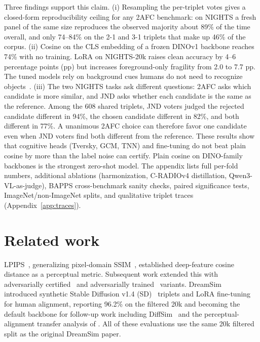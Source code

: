 \documentclass{article}
\begin{document}
Three findings support this claim.  (i) Resampling the per-triplet votes gives a closed-form reproducibility ceiling for any 2AFC benchmark: on NIGHTS a fresh panel of the same size reproduces the observed majority about 89\% of the time overall, and only 74--84\% on the 2-1 and 3-1 triplets that make up 46\% of the corpus. (ii) Cosine on the CLS embedding of a frozen DINOv1 backbone reaches 74\% with no training. LoRA on NIGHTS-20k raises clean accuracy by 4--6 percentage points (pp) but increases foreground-only fragility from 2.0 to 7.7 pp. The tuned models rely on background cues humans do not need to recognize objects~\citep{xiao2020backgrounds}. (iii) The two NIGHTS tasks ask different questions: 2AFC asks which candidate is more similar, and JND asks whether each candidate is the same as the reference. Among the 608 shared triplets, JND voters judged the rejected candidate different in 94\%, the chosen candidate different in 82\%, and both different in 77\%. A unanimous 2AFC choice can therefore favor one candidate even when JND voters find both different from the reference. These results show that cognitive heads (Tversky, GCM, TNN) and fine-tuning do not beat plain cosine by more than the label noise can certify. Plain cosine on DINO-family backbones is the strongest zero-shot model. The appendix lists full per-fold numbers, additional ablations (harmonization, C-RADIOv4 distillation, Qwen3-VL-as-judge), BAPPS cross-benchmark sanity checks, paired significance tests, ImageNet/non-ImageNet splits, and qualitative triplet traces (Appendix~\ref{app:traces}).

\section{Related work}

LPIPS~\citep{zhang2018lpips}, generalizing pixel-domain SSIM~\citep{wang2004ssim}, established deep-feature cosine distance as a perceptual metric. Subsequent work extended this with adversarially certified~\citep{lipsim2024} and adversarially trained~\citep{croce2025robustclip} variants. DreamSim~\citep{fu2023dreamsim} introduced synthetic Stable Diffusion v1.4 (SD)~\citep{rombach2022stablediffusion} triplets and LoRA fine-tuning~\citep{hu2021lora} for human alignment, reporting 96.2\% on the filtered 20k and becoming the default backbone for follow-up work including DiffSim~\citep{song2025diffsim} and the perceptual-alignment transfer analysis of \citet{sundaram2024perceptual}. All of these evaluations use the same 20k filtered split as the original DreamSim paper.
\end{document}
